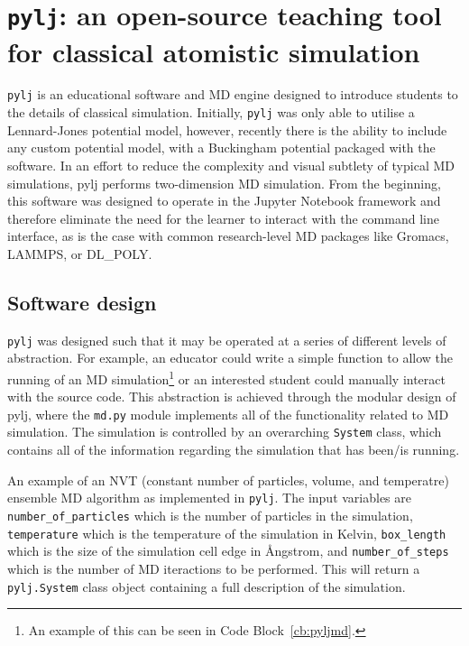 \section{\texttt{pylj}: an open-source teaching tool for classical atomistic simulation}

\texttt{pylj}\autocite[PYthon Lennard-Jones]{mccluskey_pylj_2018,mccluskey_arm61/pylj_2019-2} is an educational software and MD engine designed to introduce students to the details of classical simulation.
Initially, \texttt{pylj} was only able to utilise a Lennard-Jones potential model,\autocite{lennard-jones_determination_1924} however, recently\autocite{mccluskey_arm61/pylj_2018} there is the ability to include any custom potential model, with a Buckingham potential packaged with the software.\autocite{buckingham_classical_1938}
In an effort to reduce the complexity and visual subtlety of typical MD simulations, pylj performs two-dimension MD simulation.
From the beginning, this software was designed to operate in the Jupyter Notebook framework and therefore eliminate the need for the learner to interact with the command line interface, as is the case with common research-level MD packages like Gromacs, LAMMPS, or DL\_POLY.\autocite{berendsen_gromacs_1995,plimpton_fast_1995,smith_dl_poly_2002}

\subsection{Software design}
\texttt{pylj} was designed such that it may be operated at a series of different levels of abstraction.
For example, an educator could write a simple function to allow the running of an MD simulation\footnote{An example of this can be seen in Code Block~\ref{cb:pyljmd}.} or an interested student could manually interact with the source code.
This abstraction is achieved through the modular design of pylj, where the \texttt{md.py} module implements all of the functionality related to MD simulation.
The simulation is controlled by an overarching \texttt{System} class, which contains all of the information regarding the simulation that has been/is running.
%
\begin{listing}[t]
    \centering
    \caption{An example of an NVT (constant number of particles, volume, and temperatre) ensemble MD algorithm as implemented in \texttt{pylj}. The input variables are \texttt{number\_of\_particles} which is the number of particles in the simulation, \texttt{temperature} which is the temperature of the simulation in Kelvin, \texttt{box\_length} which is the size of the simulation cell edge in \AA ngstrom, and \texttt{number\_of\_steps} which is the number of MD iteractions to be performed. This will return a \texttt{pylj.System} class object containing a full description of the simulation.}
    
    \label{cb:pyljmd}
\end{listing}
%

